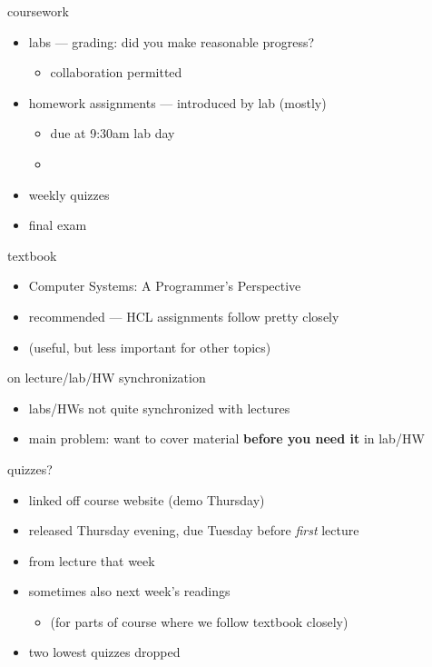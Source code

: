 \begin{frame}{coursework}
\begin{itemize}
    \item labs --- grading: did you make reasonable progress?
        \begin{itemize}
        \item collaboration permitted
        \end{itemize}
    \item homework assignments --- introduced by lab (mostly)
        \begin{itemize}
        \item due at 9:30am lab day
        \item {}
        \end{itemize}
    \item weekly quizzes
    \item final exam
\end{itemize}
\end{frame}


\begin{frame}{textbook}
    \begin{itemize}
    \item Computer Systems: A Programmer's Perspective
    \item recommended --- HCL assignments follow pretty closely
    \item (useful, but less important for other topics)
    \end{itemize}
\end{frame}

\begin{frame}{on lecture/lab/HW synchronization}
    \begin{itemize}
        \item labs/HWs not quite synchronized with lectures
        \item main problem: want to cover material \textbf{before you need it} in lab/HW
    \end{itemize}
\end{frame}


\begin{frame}{quizzes?}
    \begin{itemize}
    \item linked off course website (demo Thursday)
    \item released Thursday evening, due Tuesday before \textit{first} lecture
    \item from lecture that week
    \item sometimes also next week's readings
        \begin{itemize}
        \item (for parts of course where we follow textbook closely)
        \end{itemize}
    \vspace{.5cm}
    \item two lowest quizzes dropped
    \end{itemize}
\end{frame}

